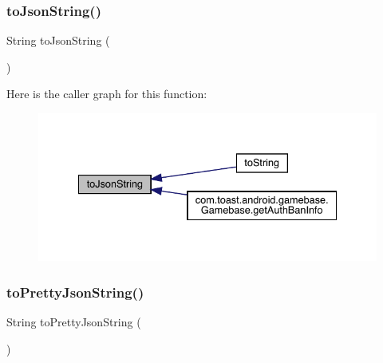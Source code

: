 \subsubsection{\texorpdfstring{to\+Json\+String()}{toJsonString()}}
{\footnotesize\ttfamily String to\+Json\+String (\begin{DoxyParamCaption}{ }\end{DoxyParamCaption})\hspace{0.3cm}{\ttfamily [inherited]}}

Here is the caller graph for this function\+:
\nopagebreak
\begin{figure}[H]
\begin{center}
\leavevmode
\includegraphics[width=335pt]{classcom_1_1toast_1_1android_1_1gamebase_1_1base_1_1_value_object_a58acf6402880e9769d79d8667581fa6a_icgraph}
\end{center}
\end{figure}
\mbox{\label{classcom_1_1toast_1_1android_1_1gamebase_1_1base_1_1_value_object_a054431f3d988a22295cfc8b784ff2637}} 
\subsubsection{\texorpdfstring{to\+Pretty\+Json\+String()}{toPrettyJsonString()}}
{\footnotesize\ttfamily String to\+Pretty\+Json\+String (\begin{DoxyParamCaption}{ }\end{DoxyParamCaption})\hspace{0.3cm}{\ttfamily [inherited]}}

